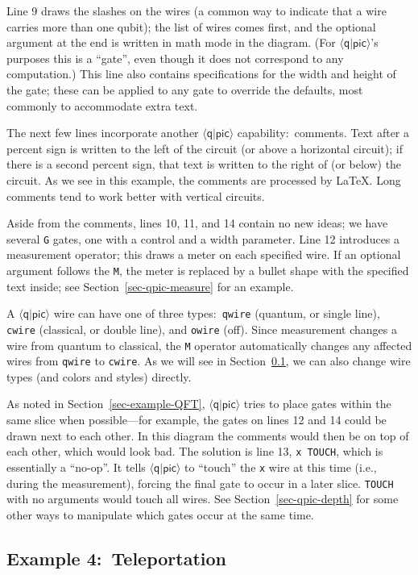 \documentclass[twoside,12pt]{article}
\newcommand{\qpic}{$\langle\mathsf{q}|\mathsf{pic}\rangle$\xspace}
\begin{document}
Line 9 draws the slashes on the wires (a common way to indicate that a
wire carries more than one qubit); the list of wires comes first, and the
optional argument at the end is written in math mode in the diagram.
(For \qpic's purposes this is a ``gate'', even though it does not
correspond to any computation.)  This line also contains specifications
for the width and height of the gate; these can be applied to any gate to
override the defaults, most commonly to accommodate extra text.


The next few lines incorporate another \qpic capability:\ comments.  Text after
a percent sign is written to the left of the circuit (or above a horizontal
circuit); if there is a second percent sign, that text is written to the
right of (or below) the circuit.  As we see in this example, the comments
are processed by \LaTeX.  Long comments tend to work better with
vertical circuits.


Aside from the comments, lines 10, 11, and 14 contain no new ideas; we
have several {\tt G} gates, one with a control and a width parameter.
Line 12 introduces a measurement operator; this draws a meter on each
specified wire.  If an optional argument follows the {\tt M}, the meter
is replaced by a bullet shape with the specified text inside; see
Section~\ref{sec-qpic-measure} for an example.


A \qpic wire can have one of three types:\ {\tt qwire} (quantum, or single line),
{\tt cwire} (classical, or double line), and {\tt owire} (off).
Since measurement changes a wire from quantum to classical, the {\tt M}
operator automatically changes any affected wires from {\tt qwire} to
{\tt cwire}.  As we will see in Section~\ref{sec-example-teleport},
we can also change wire types (and colors and styles) directly.


As noted in Section~\ref{sec-example-QFT}, \qpic tries to place gates
within the same slice when possible---for example, the gates on
lines 12 and 14 could be drawn next to each other.  In this diagram
the comments would then be on top of each other, which would look bad.
The solution is line 13, {\tt x TOUCH}, which is essentially a
``no-op''.  It tells \qpic to ``touch''
the {\tt x} wire at this time (i.e., during the measurement), forcing
the final gate to occur in a later slice.  {\tt TOUCH} with no
arguments would touch all wires.  See Section~\ref{sec-qpic-depth} for
some other ways to manipulate which gates occur at the same time.

\subsection{Example 4:\ Teleportation}
\label{sec-example-teleport}
\end{document}
